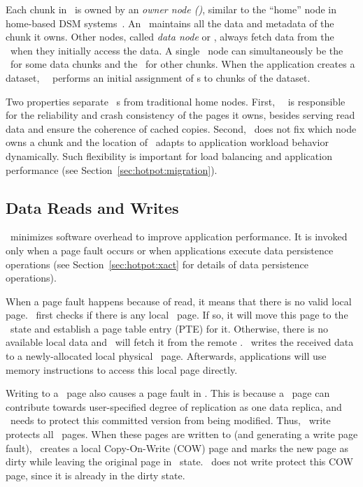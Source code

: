 Each chunk in \hotpot\ is owned by an {\em owner node (\on)},
similar to the ``home'' node in home-based DSM systems~\cite{HLRC}.
An \on\ maintains all the data and metadata of the chunk it owns.
Other nodes, called {\em data node} or {\em \dn}, always fetch data from the \on\
when they initially access the data.
A single \hotpot\ node can simultaneously be the \on\ for some data chunks and the \dn\ for other chunks.
When the application creates a dataset, 
\hotpot\ \cd\ performs an initial assignment of \on{}s to chunks of the dataset.

Two properties separate \hotpot\ \on{}s from traditional home nodes.
First, %
\hotpot\ \on\ is responsible for the reliability and crash consistency of the pages it owns,
besides serving read data and ensure the coherence of cached copies.
Second, \hotpot\ does not fix which node owns a chunk
and the location of \on\ adapts to application workload behavior dynamically.
Such flexibility is important for load balancing and application performance (see Section~\ref{sec:hotpot:migration}).

\subsection{Data Reads and Writes}
\label{sec:hotpot:readwrite}

\hotpot\ minimizes software overhead to improve application performance.
It is invoked only when a page fault occurs or when 
applications execute data persistence operations (see Section~\ref{sec:hotpot:xact} for details of data persistence operations).

When a page fault happens because of read, 
it means that there is no valid local page.
\hotpot\ first checks if there is any local \redundant\ page.
If so, it will move this page to the \committed\ state and establish a page table entry (PTE) for it.
Otherwise, there is no available local data and 
\hotpot\ will fetch it from the remote \on.
\hotpot\ writes the received data to a newly-allocated local physical \nvm\ page.
Afterwards, applications will use memory instructions to access this local page directly.


Writing to a \committed\ page also causes a page fault in \hotpot. 
This is because a \committed\ page can contribute towards user-specified degree of replication as one data replica,
and \hotpot\ needs to protect this committed version from being modified.
Thus, \hotpot\ write protects all \committed\ pages.
When these pages are written to (and generating a write page fault), 
\hotpot\ creates a local Copy-On-Write (COW) page
and marks the new page as dirty while leaving
the original page in \committed\ state.
\hotpot\ does not write protect this COW page, since it is already in the dirty state.

